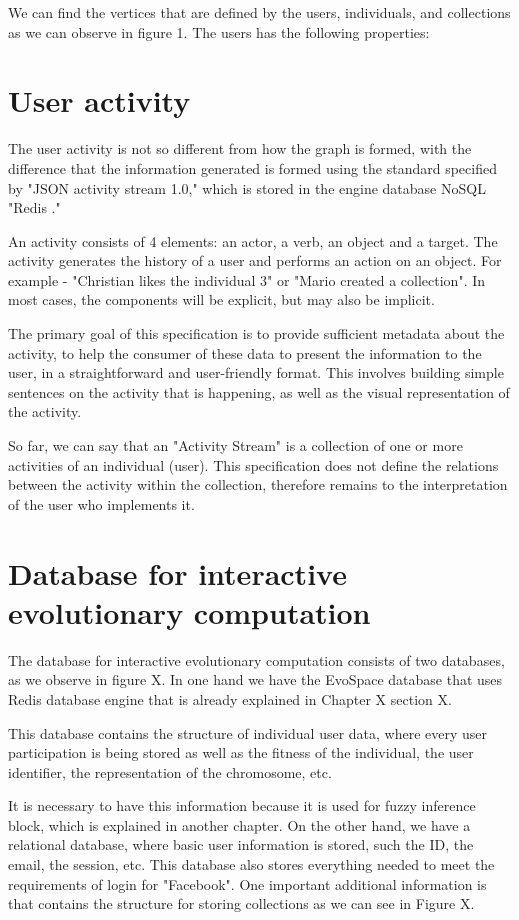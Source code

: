 We can find the vertices that are defined by the users, individuals, and collections as we can observe in figure 1. The users has the following properties:

\section{User activity}
The user activity is not so different from how the graph is formed, with the difference that the information generated is formed using the standard specified by "JSON activity stream 1.0," which is stored in the engine database NoSQL "Redis ."

An activity consists of 4 elements: an actor, a verb, an object and a target. The activity generates the history of a user and performs an action on an object. For example - "Christian likes the individual 3" or "Mario created a collection". In most cases, the components will be explicit, but may also be implicit.

The primary goal of this specification is to provide sufficient metadata about the activity, to help the consumer of these data to present the information to the user, in a straightforward and user-friendly format. This involves building simple sentences on the activity that is happening, as well as the visual representation of the activity.

So far, we can say that an "Activity Stream" is a collection of one or more activities of an individual (user).
This specification does not define the relations between the activity within the collection, therefore remains to the interpretation of the user who implements it.

\section{Database for interactive evolutionary computation}
The database for interactive evolutionary computation consists of two databases, as we observe in figure X. In one hand we have the EvoSpace database that uses Redis database engine that is already explained in Chapter X section X.

This database contains the structure of individual user data, where every user participation is being stored as well as the fitness of the individual, the user identifier, the representation of the chromosome, etc. 

It is necessary to have this information because it is used for fuzzy inference block, which is explained in another chapter. On the other hand, we have a relational database, where basic user information is stored, such the ID, the email, the session, etc. This database also stores everything needed to meet the requirements of login for "Facebook". One important additional information is that contains the structure for storing collections as we can see in Figure X.

